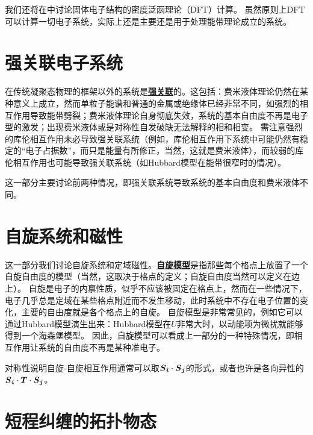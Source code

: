 \documentclass[hyperref, UTF8, a4paper, oneside]{ctexbook}
\renewcommand{\autoref}{\prettyref}
\newcommand*{\concept}[1]{\underline{\textbf{#1}}}
\numberwithin{equation}{chapter}
\begin{document}
我们还将在\autoref{chap:dft}中讨论固体电子结构的密度泛函理论（DFT）计算。
虽然原则上DFT可以计算一切电子系统，实际上还是主要还是用于处理能带理论成立的系统。









\part{强关联电子系统}

在传统凝聚态物理的框架以外的系统是\concept{强关联}的。这包括：费米液体理论仍然在某种意义上成立，然而单粒子能谱和普通的金属或绝缘体已经非常不同，如强烈的相互作用导致能带劈裂；费米液体理论自身彻底失效，系统的基本自由度不再是电子型的激发；出现费米液体或是对称性自发破缺无法解释的相和相变。
需注意强烈的库伦相互作用未必导致强关联系统（例如，库伦相互作用下系统中可能仍然有稳定的“电子占据数”，而只是能量有所修正，当然，这就是费米液体），而较弱的库伦相互作用也可能导致强关联系统（如Hubbard模型在能带很窄时的情况）。

这一部分主要讨论前两种情况，即强关联系统导致系统的基本自由度和费米液体不同。





\part{自旋系统和磁性}

这一部分我们讨论自旋系统和定域磁性。\concept{自旋模型}是指那些每个格点上放置了一个自旋自由度的模型（当然，这取决于格点的定义；自旋自由度当然可以定义在边上）。
自旋是电子的内禀性质，似乎不应该被固定在格点上，然而在一些情况下，电子几乎总是定域在某些格点附近而不发生移动，此时系统中不存在电子位置的变化，主要的自由度就是各个格点上的自旋。
自旋模型是非常常见的，例如它可以通过Hubbard模型演生出来：Hubbard模型在$U$非常大时，以动能项为微扰就能够得到一个海森堡模型。
因此，自旋模型可以看成上一部分的一种特殊情况，即相互作用让系统的自由度不再是某种准电子。

对称性说明自旋-自旋相互作用通常可以取$\vb*{S}_{\vb*{i}} \cdot \vb*{S}_{\vb*{j}}$的形式，或者也许是各向异性的$\vb*{S}_{\vb*{i}} \cdot \vb*{T} \cdot \vb*{S}_{\vb*{j}}$。



\part{短程纠缠的拓扑物态}
\end{document}
